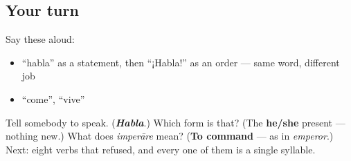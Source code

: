 \subsection*{Your turn}
Say these aloud:

\begin{itemize}
\raggedright
  \item \textquotedblleft{}habla\textquotedblright{} as a statement, then \textquotedblleft{}¡Habla!\textquotedblright{} as an order — same word, different job
  \item \textquotedblleft{}come\textquotedblright{}, \textquotedblleft{}vive\textquotedblright{}
\end{itemize}

\begin{tcolorbox}[breakable,colback=teal!4,colframe=teal!35!black,title={Before you move on}]
Tell somebody to speak. (\emph{\textbf{Habla}}.) Which form is that? (The \textbf{he/she} present — nothing new.) What does \emph{imperāre} mean? (\textbf{To command} — as in \emph{emperor}.) Next: eight verbs that refused, and every one of them is a single syllable.
\end{tcolorbox}
